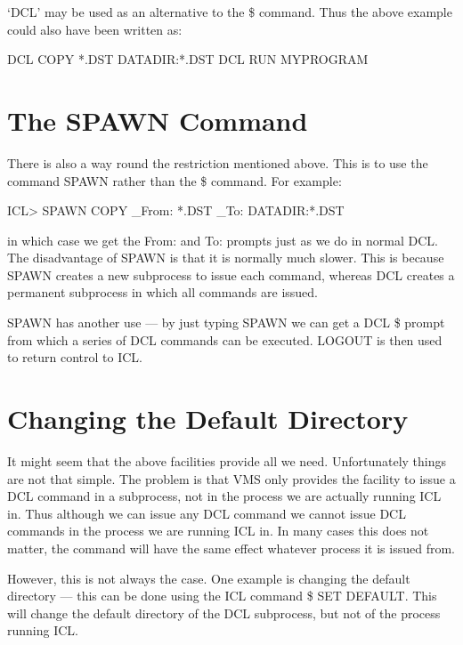 \documentclass[twoside,11pt,nolof,chapters]{starlink}
\begin{document}
`DCL' may be used as an alternative to the \$ command. Thus the
above example could also have been written as:

\begin{terminalv}

    DCL COPY *.DST DATADIR:*.DST
    DCL RUN MYPROGRAM

\end{terminalv}

\section{The SPAWN Command}
There is also a way round the restriction mentioned above. This is to
use the command SPAWN rather than the \$ command. For example:

\begin{terminalv}

    ICL> SPAWN COPY
    _From: *.DST
    _To: DATADIR:*.DST

\end{terminalv}
in which case we get the From: and To: prompts just as we do in normal DCL.
The disadvantage of SPAWN is that it is normally much slower. This is because
SPAWN creates a new subprocess to issue each command, whereas DCL creates
a permanent subprocess in which all commands are issued.

SPAWN has another use --- by just typing SPAWN we can get a DCL \$ prompt
from which a series of DCL commands can be executed. LOGOUT is then used
to return control to ICL.

\section{Changing the Default Directory}
It might seem that the above facilities provide all we need. Unfortunately
things are not that simple. The problem is that VMS only provides the facility
to issue a DCL command in a subprocess, not in the process we are actually
running ICL in. Thus although we can issue any DCL command we cannot issue
DCL commands in the process we are running ICL in. In many cases this does not
matter, the command will have the same effect whatever process it is issued
from.

However, this is not always the case. One example is changing the default
directory --- this can be done using the ICL command \$ SET DEFAULT. This
will change the default directory of the DCL subprocess, but not of the
process running ICL.
\end{document}
